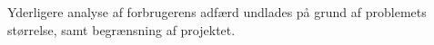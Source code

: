 Yderligere analyse af forbrugerens adfærd undlades på grund af problemets størrelse, samt begrænsning af projektet.









 
 


